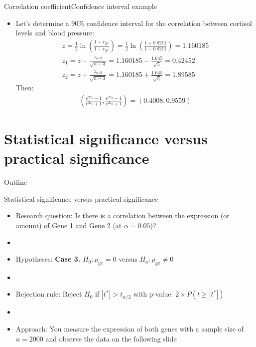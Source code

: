 \documentclass[xcolor=dvipsnames]{beamer}
\begin{document}
\begin{frame}{Correlation coefficient}{Confidence interval example}
	\begin{itemize}
		\item Let's determine a 90\% confidence interval for the correlation between cortisol levels and blood pressure:
		\begin{gather*}
		z = \frac{1}{2} \ln \left( \frac{1+r_{yx}}{1-r_{yx}} \right) =  \frac{1}{2} \ln \left( \frac{1+0.8211}{1-0.8211} \right) = 1.160185\\
		z_1 = z - \frac{z_{\alpha / 2}}{\sqrt{n-3}} = 1.160185 - \frac{1.645}{\sqrt{5}} = 0.42452 \\
		z_2 = z + \frac{z_{\alpha / 2}}{\sqrt{n-3}} = 1.160185 + \frac{1.645}{\sqrt{5}} = 1.89585
		\end{gather*}
		Then: 
		\begin{gather*}
		\left(\frac{e^{2 z_1}-1}{e^{2 z_1}+1}, \frac{e^{2 z_2}-1}{e^{2 z_2}+1} \right) = (0.4008, 0.9559)
		\end{gather*}

	\end{itemize}
\end{frame}

\section{Statistical significance versus practical significance}
\begin{frame}{Outline}
	\tableofcontents[currentsection,subsectionstyle=show/shaded/hide]
\end{frame}

\begin{frame}{Statistical significance versus practical significance}
	\begin{itemize}
		\item Research question: Is there is a correlation between the expression (or amount) of Gene 1 and Gene 2 (at $\alpha = 0.05$)? \pause
		\item[]
		\item Hypotheses: \textbf{Case 3.} $H_0: \rho_{yx} = 0$ versus $H_a: \rho_{yx} \neq 0$ \pause
		\item[]
		\item Rejection rule: Reject $H_0$ if $|t^*| > t_{\alpha / 2}$ with p-value: $2\times P(t\geq |t^*|)$ \pause
		\item[]
		\item Approach: You measure the expression of both genes with a sample size of $n = 2000$ and observe the data on the following slide
	\end{itemize}
\end{frame}
\end{document}
